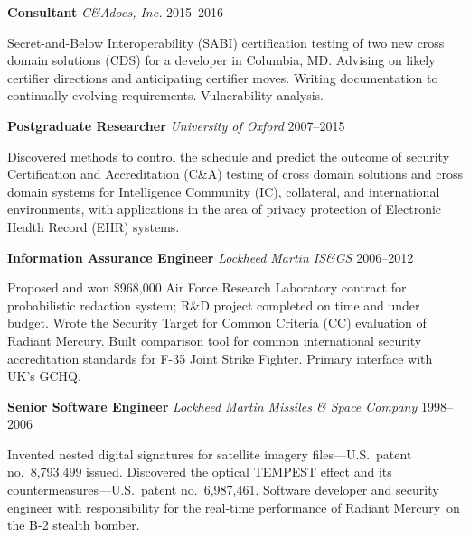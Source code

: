 \vspace{3mm}
\noindent\textbf{Consultant}
    \hfill \emph{C\&Adocs, Inc.} \hfill 2015--2016

    \vspace{1mm}
    \noindent Secret-and-Below Interoperability (SABI) certification
    testing of two new cross domain solutions (CDS) for a developer in
    Columbia, MD. Advising on likely certifier directions and anticipating
    certifier moves. Writing documentation to continually evolving
    requirements. Vulnerability analysis.

\vspace{2mm}
\noindent\textbf{Postgraduate Researcher}
    \hfill \emph{University of Oxford} \hfill 2007--2015

    \vspace{1mm}
    \noindent Discovered methods to control the schedule and predict the
    outcome of security Certification and Accreditation (C\&A)
    testing of cross domain solutions and cross domain systems for
    Intelligence Community (IC), collateral, and international
    environments, with applications in the area of privacy protection
    of Electronic Health Record (EHR) systems.

\vspace{2mm}
\noindent\textbf{Information Assurance Engineer}
    \hfill \emph{Lockheed Martin IS\&GS} \hfill 2006--2012

    \vspace{1mm}
    \noindent Proposed and won \$968,000 Air Force Research Laboratory
    contract for probabilistic redaction system; R\&D
    project completed on time and under budget. Wrote the
    Security Target for Common Criteria (CC) evaluation of Radiant
    Mercury\rmtrademark. Built comparison tool for common international
    security accreditation standards for F-35 Joint Strike Fighter.
    Primary interface with UK's GCHQ.

\vspace{2mm}
\noindent\textbf{Senior Software Engineer}
    \hfill \emph{Lockheed Martin Missiles \& Space Company} \hfill 1998--2006

    \vspace{1mm}
    \noindent Invented nested digital signatures for satellite imagery
    files---U.S.\ patent no.~8,793,499 issued. Discovered the
    optical TEMPEST effect and its countermeasures---U.S.\ patent
    no.~6,987,461. Software developer and security engineer with
    responsibility for the real-time performance of Radiant
    Mercury\rmtrademark\ on the B-2 stealth bomber.

